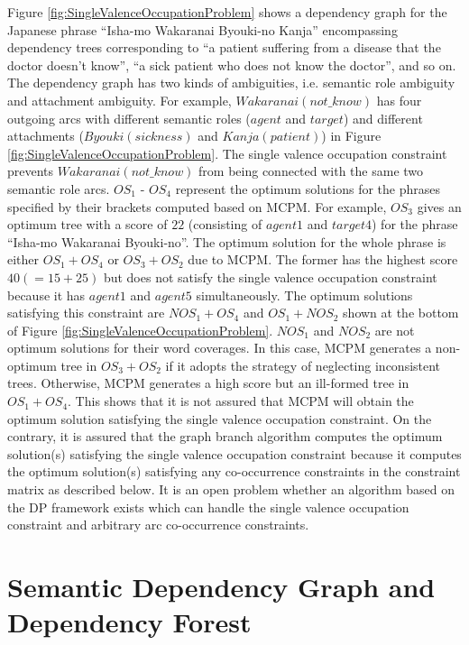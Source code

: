 Figure \ref{fig:SingleValenceOccupationProblem} shows a dependency
graph for the Japanese phrase ``Isha-mo Wakaranai Byouki-no Kanja''
encompassing dependency trees corresponding to ``a patient suffering
from a disease that the doctor doesn't know'', ``a sick patient who
does not know the doctor'', and so on. The dependency graph has two
kinds of ambiguities, i.e. semantic role ambiguity and attachment
ambiguity. For example, $Wakaranai(not\_know)$ has four outgoing arcs
with different semantic roles ($agent$ and $target$) and different
attachments ($Byouki(sickness)$ and $Kanja(patient)$) in Figure
\ref{fig:SingleValenceOccupationProblem}. The single valence
occupation constraint prevents $Wakaranai(not\_know)$ from being
connected with the same two semantic role arcs. $OS_1$ - $OS_4$
represent the optimum solutions for the phrases specified by their
brackets computed based on MCPM. For example, $OS_3$ gives an optimum
tree with a score of $22$ (consisting of $agent1$ and $target4$) for
the phrase ``Isha-mo Wakaranai Byouki-no''. The optimum solution for
the whole phrase is either $OS_1+OS_4$ or $OS_3+OS_2$ due to MCPM. The
former has the highest score $40(=15+25)$ but does not satisfy the
single valence occupation constraint because it has $agent1$ and
$agent5$ simultaneously. The optimum solutions satisfying this
constraint are $NOS_1+OS_4$ and $OS_1+NOS_2$ shown at the bottom of
Figure \ref{fig:SingleValenceOccupationProblem}. $NOS_1$ and $NOS_2$
are not optimum solutions for their word coverages. In this case, MCPM
generates a non-optimum tree in $OS_3+OS_2$ if it adopts the strategy
of neglecting inconsistent trees. Otherwise, MCPM generates a high
score but an ill-formed tree in $OS_1+OS_4$. This shows that it is not
assured that MCPM will obtain the optimum solution satisfying the
single valence occupation constraint. 
On the contrary, it is assured that the graph branch algorithm
computes the optimum solution(s) satisfying the single valence
occupation constraint because it computes the optimum solution(s)
satisfying any co-occurrence constraints in the constraint matrix
as described below. It is an open problem whether an algorithm based
on the DP framework exists which can handle the single valence
occupation constraint and arbitrary arc co-occurrence constraints.


\section{Semantic Dependency Graph and Dependency Forest}
\label{sec:SemanticDependencyGraphAndDependencyForest}

